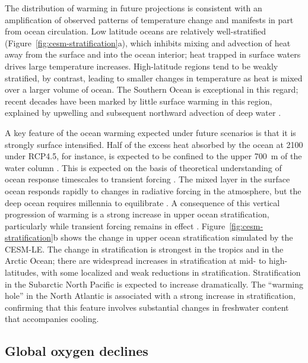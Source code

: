 \documentclass{report_chapter}
\begin{document}
The distribution of warming in future projections is consistent with an amplification of observed patterns of temperature change \citep{Levitus-Antonov-etal-2012} and manifests in part from ocean circulation.
Low latitude oceans are relatively well-stratified (Figure~\ref{fig:cesm-stratification}a), which inhibits mixing and advection of heat away from the surface and into the ocean interior; heat trapped in surface waters drives large temperature increases.
High-latitude regions tend to be weakly stratified, by contrast, leading to smaller changes in temperature as heat is mixed over a larger volume of ocean.
The Southern Ocean is exceptional in this regard; recent decades have been marked by little surface warming in this region, explained by upwelling and subsequent northward advection of deep water \citep{Armour-Marshall-etal-2016}.

A key feature of the ocean warming expected under future scenarios is that it is strongly surface intensified.
Half of the excess heat absorbed by the ocean at 2100 under RCP4.5, for instance, is expected to be confined to the upper 700~m of the water column \citep{Collins-Knutti-etal-2013}.
This is expected on the basis of theoretical understanding of ocean response timescales to transient forcing \citep{Held-Winton-etal-2010,Stouffer-2004}.
The mixed layer in the surface ocean responds rapidly to changes in radiative forcing in the atmosphere, but the deep ocean requires millennia to equilibrate \citep{Hansen-Sato-etal-2011,Li-Storch-etal-2013}.
A consequence of this vertical progression of warming is a strong increase in upper ocean stratification, particularly while transient forcing remains in effect \citep{Xu-Xie-etal-2012,Xu-Xie-etal-2013}.
Figure~\ref{fig:cesm-stratification}b shows the change in upper ocean stratification simulated by the CESM-LE.
The change in stratification is strongest in the tropics and in the Arctic Ocean; there are widespread increases in stratification at mid- to high-latitudes, with some localized and weak reductions in stratification.
Stratification in the Subarctic North Pacific is expected to increase dramatically.
The ``warming hole'' in the North Atlantic is associated with a strong increase in stratification, confirming that this feature involves substantial changes in freshwater content that accompanies cooling.

\subsection{Global oxygen declines}
\end{document}
